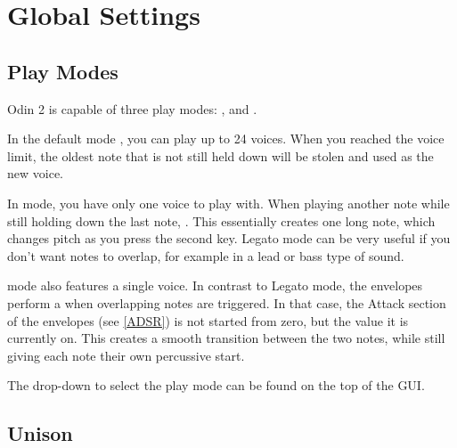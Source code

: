 \chapter{Global Settings}
\label{global}

\section{Play Modes}
\label{legato}

Odin 2 is capable of three play modes: ,  and .

\vspace{3mm}
In the default mode , you can play up to 24 voices. When you reached the voice limit, the oldest note that is not still held down will be stolen and used as the new voice.

\vspace{3mm}
In  mode, you have only one voice to play with. When playing another note while still holding down the last note, . 
This essentially creates one long note, which changes pitch as you press the second key. Legato mode can be very useful if you don't want notes to overlap, for example in a lead or bass type of sound. 

\vspace{3mm}
 mode also features a single voice. In contrast to Legato mode, the envelopes perform a  when overlapping notes are triggered. In that case, the Attack section of the envelopes (see \ref{ADSR})
is not started from zero, but the value it is currently on. This creates a smooth transition between the two notes, while still giving each note their own percussive start.

\vspace{3mm}
The drop-down to select the play mode can be found on the top of the GUI.



\clearpage
\section{Unison}
\label{unison}


